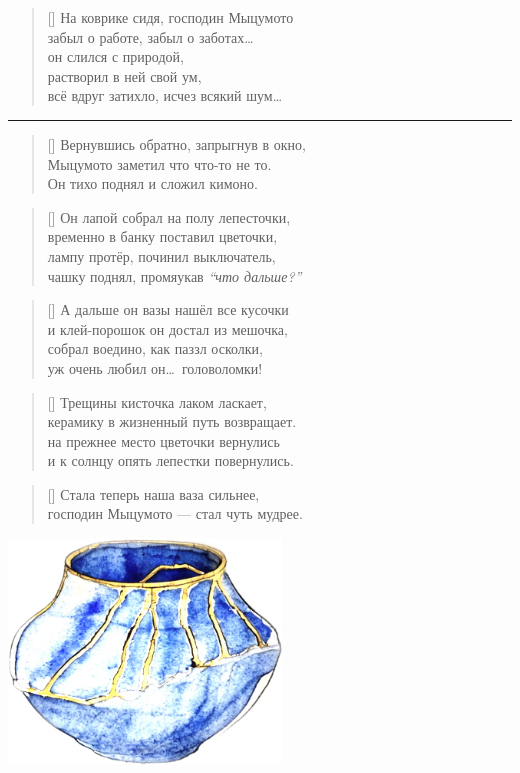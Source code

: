 \documentclass[14pt]{memoir}
\begin{document}
\begin{verse}[\versewidth]
На коврике сидя, господин Мыцумото\\ 
забыл о работе, забыл о заботах\ldots \\
он слился с природой, \\
растворил в ней свой ум,\\ 
всё вдруг затихло, исчез всякий шум\ldots 
\end{verse}

\clearpage
\fancybreak{* * *}

\begin{verse}[\versewidth]
Вернувшись обратно, запрыгнув в окно, \\
Мыцумото заметил что что-то не то. \\
Он тихо поднял и сложил кимоно. 
\end{verse}

\begin{verse}[\versewidth]
Он лапой собрал на полу лепесточки, \\
временно в банку поставил цветочки,\\ 
лампу протёр, починил выключатель, \\
чашку поднял, промяукав \emph{``что дальше?''} 
\end{verse}

\begin{verse}[\versewidth]
А дальше он вазы нашёл все кусочки \\
и клей-порошок он достал из мешочка,\\
собрал воедино, как паззл осколки, \\
уж очень любил он\ldots ~головоломки!
\end{verse}

\begin{verse}[\versewidth]
Трещины кисточка лаком ласкает, \\
керамику в жизненный путь возвращает. \\
на прежнее место цветочки вернулись\\ 
и к солнцу опять лепестки повернулись.
\end{verse}

\begin{verse}[\versewidth]
Стала теперь наша ваза сильнее, \\
господин Мыцумото --- стал чуть мудрее.
\end{verse}

\begin{center}
\includegraphics[height=6cm]{images/vase} 
\end{center}
\newpage
\end{document}
